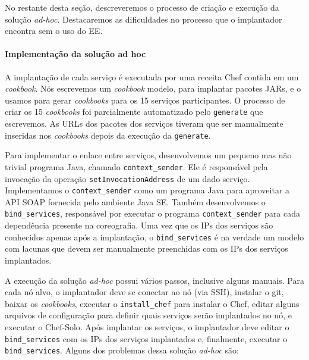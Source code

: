 No restante desta seção, descreveremos o processo de criação e execução
da solução \emph{ad-hoc}. Destacaremos as dificuldades no processo
que o implantador encontra sem o uso do EE.

\paragraph{Implementação da solução ad hoc}
A implantação de cada serviço é executada por uma receita Chef contida em um \emph{cookbook}.
Nós escrevemos um \emph{cookbook} modelo, para implantar pacotes JARs,
e o usamos para gerar \emph{cookbooks} para os 15 serviços participantes.
O processo de criar os 15 \emph{cookbooks} foi parcialmente automatizado
pelo \script \texttt{generate} que escrevemos.
As URLs dos pacotes dos serviços tiveram que ser manualmente inseridas nos
\emph{cookbooks} depois da execução da \script \texttt{generate}.

Para implementar o enlace entre serviços,
desenvolvemos um pequeno mas não trivial programa Java, chamado \texttt{context\_sender}. 
Ele é responsável pela invocação da operação \texttt{setInvocation\allowbreak Address} de um dado serviço.
Implementamos o \texttt{context\_sender} como um programa Java para
aproveitar a API SOAP fornecida pelo ambiente Java SE.
Também desenvolvemos o \script \texttt{bind\_services},
responsável por executar o programa \texttt{context\_sender}
para cada dependência presente na coreografia.
Uma vez que os IPs dos serviços são conhecidos apenas após a implantação,
o \script \texttt{bind\_services} é na verdade um modelo com lacunas
que devem ser manualmente preenchidas com os IPs dos serviços implantados.

A execução da solução \emph{ad-hoc} possui vários passos,
inclusive alguns manuais.
Para cada nó alvo, o implantador deve se conectar ao nó (via SSH),
instalar o git, baixar os \emph{cookbooks}, executar o \script \texttt{install\_chef} 
para instalar o Chef, editar alguns arquivos de configuração para definir
quais serviços serão implantados no nó, e executar o Chef-Solo.
Após implantar os serviços, o implantador deve editar o \script
\texttt{bind\_services} com os IPs dos serviços implantados
e, finalmente, executar o \script \texttt{bind\_services}.
Alguns dos problemas dessa solução \emph{ad-hoc} são:

